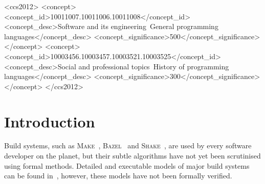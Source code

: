 \documentclass[sigplan,review]{acmart}\settopmatter{printfolios=true,printccs=false,printacmref=false}
\newcommand{\Bazel}{\textsc{Bazel}\xspace}
\newcommand{\Make}{\textsc{Make}\xspace}
\newcommand{\Shake}{\textsc{Shake}\xspace}
\begin{document}
\begin{CCSXML}
<ccs2012>
<concept>
<concept_id>10011007.10011006.10011008</concept_id>
<concept_desc>Software and its engineering~General programming languages</concept_desc>
<concept_significance>500</concept_significance>
</concept>
<concept>
<concept_id>10003456.10003457.10003521.10003525</concept_id>
<concept_desc>Social and professional topics~History of programming languages</concept_desc>
<concept_significance>300</concept_significance>
</concept>
</ccs2012>
\end{CCSXML}




\maketitle

\vspace{-3mm}
\section{Introduction}
\vspace{-1mm}

Build systems, such as \Make~\cite{feldman1979make},
\Bazel~\cite{bazel} and \Shake~\cite{mitchell2012shake}, are used by every
software developer on the planet, but their subtle algorithms have not yet been
scrutinised using formal methods. Detailed and executable models of major build
systems can be found in~\cite{Mokhov2018icfp}, however, these models have not
been formally verified.
\end{document}
